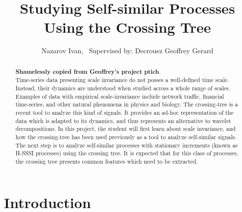 \documentclass[a4paper,14pt]{extreport}
\title{Studying Self-similar Processes Using the Crossing Tree}
\author{Nazarov Ivan, \rus{101мНОД(ИССА)}\
	{\small Supervised by: Decrouez Geoffrey Gerard}}
\begin{document}

\clearpage


\clearpage

\maketitle
\begin{abstract}
\textbf{Shamelessly copied from Geoffrey's project ptich}.\hfill \\
Time-series data presenting scale invariance do not posses a well-defined time scale.
Instead, their dynamics are understood when studied across a whole range of scales.
Examples of data with empirical scale-invariance include network traffic, financial
time-series, and other natural phenomena in physics and biology. The crossing-tree
is a recent tool to analyze this kind of signals. It provides an ad-hoc representation
of the data which is adapted to its dynamics, and thus represents an alternative to
wavelet decompositions. In this project, the student will first learn about scale
invariance, and how the crossing-tree has been used previously as a tool to analyze
self-similar signals. The next step is to analyze self-similar processes with stationary
increments (known as H-SSSI processes) using the crossing tree. It is expected that
for this class of processes, the crossing tree presents common features which need
to be extracted.
\end{abstract}

\tableofcontents
\clearpage
{}


\chapter*{Introduction} %
\label{cha:introduction}


\clearpage
 

\clearpage



\clearpage


% 




\end{document}
